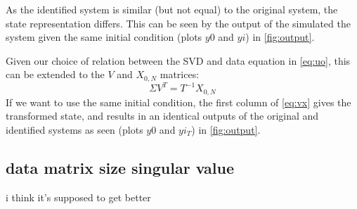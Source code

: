 \documentclass[11pt,a4paper]{article}
\begin{document}
As the identified system is similar (but not equal) to the original system, the
state representation differs. This can be seen by the output of the simulated
the system given the same initial condition (plots $y0$ and $yi$) in
\autoref{fig:output}.

Given our choice of relation between the SVD and data equation in
\autoref{eq:uo}, this can be extended to the $V$ and $X_{0, N}$ matrices:
\begin{equation}
    \label{eq:vx}
    \Sigma V^T = T^{-1} X_{0, N}
\end{equation}
If we want to use the same initial condition, the first column of
\autoref{eq:vx} gives the transformed state, and results in an identical
outputs of the original and identified systems as seen (plots $y0$ and $yi_T$)
in \autoref{fig:output}.

\subsection{data matrix size singular value}
i think it's supposed to get better
\end{document}
